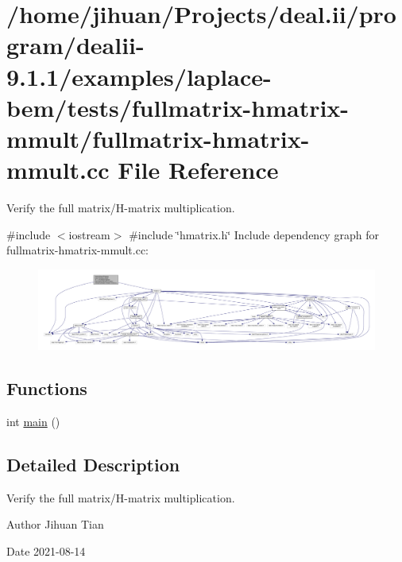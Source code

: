 \hypertarget{fullmatrix-hmatrix-mmult_8cc}{}\section{/home/jihuan/\+Projects/deal.ii/program/dealii-\/9.1.1/examples/laplace-\/bem/tests/fullmatrix-\/hmatrix-\/mmult/fullmatrix-\/hmatrix-\/mmult.cc File Reference}
\label{fullmatrix-hmatrix-mmult_8cc}


Verify the full matrix/\+H-\/matrix multiplication.  


{\ttfamily \#include $<$iostream$>$}\newline
{\ttfamily \#include \char`\"{}hmatrix.\+h\char`\"{}}\newline
Include dependency graph for fullmatrix-\/hmatrix-\/mmult.cc\+:
\nopagebreak
\begin{figure}[H]
\begin{center}
\leavevmode
\includegraphics[width=350pt]{fullmatrix-hmatrix-mmult_8cc__incl}
\end{center}
\end{figure}
\subsection*{Functions}
\begin{DoxyCompactItemize}
\item 
int \hyperlink{fullmatrix-hmatrix-mmult_8cc_ae66f6b31b5ad750f1fe042a706a4e3d4}{main} ()
\end{DoxyCompactItemize}


\subsection{Detailed Description}
Verify the full matrix/\+H-\/matrix multiplication. 

\begin{DoxyAuthor}{Author}
Jihuan Tian 
\end{DoxyAuthor}
\begin{DoxyDate}{Date}
2021-\/08-\/14 
\end{DoxyDate}


